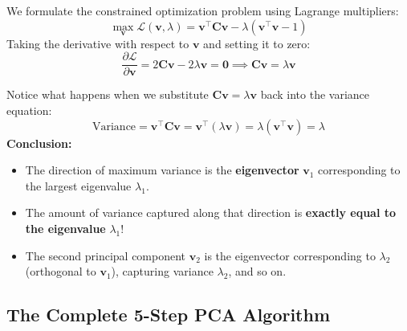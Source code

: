 \documentclass[11pt, a4paper]{article}
\begin{document}
We formulate the constrained optimization problem using Lagrange multipliers:
$$\max_{\mathbf{v}} \mathcal{L}(\mathbf{v}, \lambda) = \mathbf{v}^\top \mathbf{C} \mathbf{v} - \lambda (\mathbf{v}^\top \mathbf{v} - 1)$$
Taking the derivative with respect to $\mathbf{v}$ and setting it to zero:
$$\frac{\partial \mathcal{L}}{\partial \mathbf{v}} = 2\mathbf{C}\mathbf{v} - 2\lambda \mathbf{v} = \mathbf{0} \implies \mathbf{C}\mathbf{v} = \lambda \mathbf{v}$$
\begin{explainbox}
Notice what happens when we substitute $\mathbf{C}\mathbf{v} = \lambda \mathbf{v}$ back into the variance equation:
$$\text{Variance} = \mathbf{v}^\top \mathbf{C} \mathbf{v} = \mathbf{v}^\top (\lambda \mathbf{v}) = \lambda (\mathbf{v}^\top \mathbf{v}) = \lambda$$
\textbf{Conclusion:}
\begin{itemize}[leftmargin=1.2em]
    \item The direction of maximum variance is the \textbf{eigenvector} $\mathbf{v}_1$ corresponding to the largest eigenvalue $\lambda_1$.
    \item The amount of variance captured along that direction is \textbf{exactly equal to the eigenvalue} $\lambda_1$!
    \item The second principal component $\mathbf{v}_2$ is the eigenvector corresponding to $\lambda_2$ (orthogonal to $\mathbf{v}_1$), capturing variance $\lambda_2$, and so on.
\end{itemize}
\end{explainbox}

\subsection{The Complete 5-Step PCA Algorithm}
\end{document}
